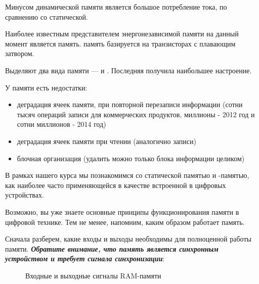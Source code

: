 \par{Минусом динамической памяти является большое потребление тока, по сравнению со статической.}

\vspace{4mm}

\par{Наиболее известным представителем энергонезависимой памяти на данный момент является  память.  память базируется на транзисторах с плавающим затвором.}

\par{Выделяют два вида  памяти —  и . Последняя получила наибольшее настроение.}

\par{У  памяти есть недостатки:}
  \begin{itemize}%
    \item деградация ячеек памяти, при повторной перезаписи информации  (сотни тысяч операций записи для коммерческих продуктов, миллионы - 2012 год и сотни миллионов - 2014 год)
    \item деградация ячеек памяти при чтении (аналогично записи)
    \item блочная организация (удалить можно только блока информации целиком)
  \end{itemize}

\par{В рамках нашего курса мы познакомимся со статической памятью и -памятью, как наиболее часто применяющейся в качестве встроенной в цифровых устройствах.}

\par{Возможно, вы уже знаете основные принципы функционирования памяти в цифровой технике. Тем не менее, напомним, каким образом работает  память.}

\par{Сначала разберем, какие входы и выходы необходимы для полноценной работы памяти. \textbf{\textit{Обратите внимание, что память является синхронным устройством и требует сигнала синхронизации}}:}

\begin{figure}[H]
	\centering
	\def\svgwidth{10cm}
	
	\caption{Входные и выходные сигналы RAM-памяти}
\end{figure}

